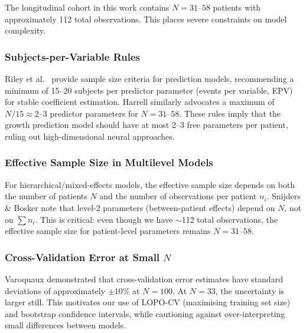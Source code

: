 The longitudinal cohort in this work contains $N = 31$--$58$ patients with
approximately 112 total observations. This places severe constraints on model
complexity.

\subsubsection{Subjects-per-Variable Rules}

Riley et al.\ \cite{riley2019pmsampsize} provide sample size criteria for
prediction models, recommending a minimum of 15--20 subjects per predictor
parameter (events per variable, EPV) for stable coefficient estimation.
Harrell \cite{harrell2015regression} similarly advocates a maximum of
$N/15 \approx 2$--$3$ predictor parameters for $N = 31$--$58$. These rules
imply that the growth prediction model should have at most 2--3 free
parameters per patient, ruling out high-dimensional neural approaches.

\subsubsection{Effective Sample Size in Multilevel Models}

For hierarchical/mixed-effects models, the effective sample size depends on
both the number of patients $N$ and the number of observations per patient
$n_i$. Snijders \& Bosker \cite{snijders2012multilevel} note that
level-2 parameters (between-patient effects) depend on $N$, not on
$\sum n_i$. This is critical: even though we have $\sim$112 total
observations, the effective sample size for patient-level parameters remains
$N = 31$--$58$.

\subsubsection{Cross-Validation Error at Small $N$}

Varoquaux \cite{varoquaux2018cv} demonstrated that cross-validation error
estimates have standard deviations of approximately $\pm 10\%$ at $N = 100$.
At $N = 33$, the uncertainty is larger still. This motivates our use of LOPO-CV
(maximising training set size) and bootstrap confidence intervals, while
cautioning against over-interpreting small differences between models.


